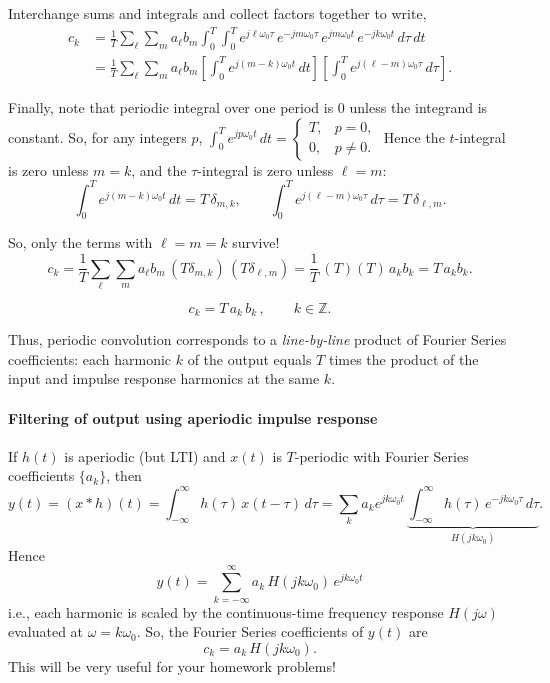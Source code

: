 \documentclass{ee102_notes}
\begin{document}
Interchange sums and integrals and collect factors together to write,
\[
\begin{aligned}
c_k
&=\frac1T\sum_{\ell}\sum_{m} a_\ell b_m
\int_{0}^{T}\!\!\int_{0}^{T}
e^{j\ell\omega_0 \tau} \, e^{-jm\omega_0 \tau}\,
e^{jm\omega_0 t}\,e^{-jk\omega_0 t}\, d\tau\,dt \\
&=\frac1T\sum_{\ell}\sum_{m} a_\ell b_m
\left[\int_{0}^{T} e^{j(m-k)\omega_0 t}\,dt\right]
\left[\int_{0}^{T} e^{j(\ell-m)\omega_0 \tau}\,d\tau\right].
\end{aligned}
\]

Finally, note that periodic integral over one period is 0 unless the integrand is constant. So, for any integers $p$,
\(
\int_{0}^{T} e^{jp\omega_0 t}\,dt
=\begin{cases}
T, & p=0,\\
0, & p\neq 0.
\end{cases}
\)
Hence the $t$-integral is zero unless $m=k$, and the $\tau$-integral is zero
unless $\ell=m$:
\[
\int_{0}^{T} e^{j(m-k)\omega_0 t}\,dt = T\,\delta_{m,k},
\qquad
\int_{0}^{T} e^{j(\ell-m)\omega_0 \tau}\,d\tau = T\,\delta_{\ell,m}.
\]

So, only the terms with $\ell=m=k$ survive!
\[
c_k=\frac1T \sum_{\ell}\sum_{m} a_\ell b_m \,(T\delta_{m,k})\,(T\delta_{\ell,m})
=\frac1T \,(T)(T)\, a_k b_k
= T\,a_k b_k .
\]

\[
c_k = T\,a_k\,b_k\,,\qquad k\in\mathbb{Z}.
\]

Thus, periodic convolution corresponds to a \emph{line-by-line} product of Fourier Series
coefficients: each harmonic $k$ of the output equals $T$ times the product of
the input and impulse response harmonics at the same $k$.



\paragraph{Filtering of output using aperiodic impulse response}

If $h(t)$ is aperiodic (but LTI) and $x(t)$ is $T$-periodic with Fourier Series coefficients $\{a_k\}$, then
\[
y(t)=(x*h)(t)=\int_{-\infty}^{\infty} h(\tau)\,x(t-\tau)\,d\tau
= \sum_{k} a_k e^{jk\omega_0 t}\,\underbrace{\int_{-\infty}^{\infty} h(\tau)\,e^{-jk\omega_0 \tau}\,d\tau}_{\displaystyle H(jk\omega_0)}.
\]
Hence
\[
\,y(t)=\sum_{k=-\infty}^{\infty} a_k\,H(jk\omega_0)\,e^{jk\omega_0 t}\,
\]
i.e., each harmonic is scaled by the continuous-time frequency response $H(j\omega)$ evaluated at $\omega= k\omega_0$. So, the Fourier Series coefficients of $y(t)$ are
\[
c_k=a_k\,H(jk\omega_0).
\]
This will be very useful for your homework problems!
\end{document}
